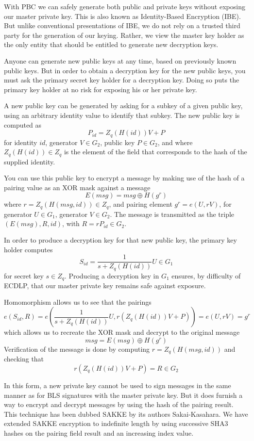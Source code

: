 \documentclass[article,oneside]{memoir}
\begin{document}
With PBC we can safely generate both public and private keys without exposing our master private key. This is also known as Identity-Based Encryption (IBE). But unlike conventional presentations of IBE, we do not rely on a trusted third party for the generation of our keying. Rather, we view the master key holder as the only entity that should be entitled to generate new decryption keys. 

Anyone can generate new public keys at any time, based on previously known public keys.
But in order to obtain a decryption key for the new public keys, you must ask the primary secret key holder for a decryption key. Doing so puts the primary key holder at no risk for exposing his or her private key.

A new public key can be generated by asking for a subkey of a given public key, using an arbitrary identity value to identify that subkey. The new public key is computed as $$ P_{id} = Z_q(H(id)) V + P$$ for identity $id$, generator $V \in G_2$, public key $P \in G_2$, and where $Z_q(H(id)) \in Z_q$ is the element of the field that corresponds to the hash of the supplied identity. 

You can use this public key to encrypt a message by making use of the hash of a pairing value as an XOR mask against a message $$E(msg) = msg \oplus H(g^r)$$ where $r = Z_q(H(msg, id)) \in Z_q$, and pairing element $g^r = e(U, r V)$, for generator $U \in G_1$, generator $V \in G_2$. The message is transmitted as the triple $(E(msg), R, id)$, with $R = r P_{id} \in G_2$.

In order to produce a decryption key for that new public key, the primary key holder computes $$S_{id} = \frac{1}{s + Z_q(H(id))} U \in G_1$$ for secret key $s \in Z_q$. Producing a decryption key in $G_1$ ensures, by difficulty of ECDLP, that our master private key remains safe against exposure.

Homomorphism allows us to see that the pairings 
$$e(S_{id}, R) = e(\frac{1}{s + Z_q(H(id))} U, r(Z_q(H(id)) V + P)) = e(U, r V) = g^r$$ which allows us to recreate the XOR mask and decrypt to the original message $$msg = E(msg) \oplus H(g^r)$$ Verification of the message is done by computing $r = Z_q(H(msg, id))$ and checking that $$r (Z_q(H(id)) V + P) = R \in G_2$$

In this form, a new private key cannot be used to sign messages in the same manner as for BLS signatures with the master private key. But it does furnish a way to encrypt and decrypt messages by using the hash of the pairing result. This technique has been dubbed SAKKE by its authors Sakai-Kasahara\cite{sakke}. We have extended SAKKE encryption to indefinite length by using successive SHA3 hashes on the pairing field result and an increasing index value.
\end{document}
